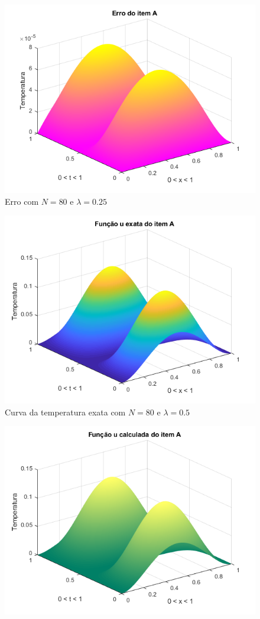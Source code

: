 \documentclass[12pt]{article}
\begin{document}
\begin{spacing}{1.5}
\begin{figure}
    \includegraphics[width=0.8\linewidth]{Primeira_Tarefa/ItemA/n80_lambda0-25_erro.png}
    \caption{Erro com $N=80$ e $\lambda=0.25$}
    \label{fig:A_n80lambda0-25_erro}
\end{figure}
\begin{figure}
    \centering
    \includegraphics[width=0.8\linewidth]{Primeira_Tarefa/ItemA/n80_lambda0-5_exata.png}
    \caption{Curva da temperatura exata com $N=80$ e $\lambda=0.5$}
    \label{fig:A_n80lambda0-5_exata}
\end{figure}
\begin{figure}
    \centering
    \includegraphics[width=0.8\linewidth]{Primeira_Tarefa/ItemA/n80_lambda0-5_calc.png}

\end{figure}
\end{spacing}
\end{document}
